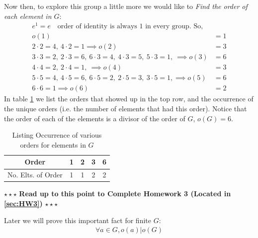\begin{example}
\noindent Now then, to explore this group a little more we would like to \textit{Find the order of
each element in $G$}:
\begin{align}
    e^1=e \ \ \ \text{ order of identity is always 1 in every group. So,}  \nonumber \\
    o(1)&=1  \nonumber \\
    2\cdot 2= 4, \ 4\cdot 2= 1 \implies o(2)&=3 \nonumber \\
    3\cdot 3= 2, \ 2\cdot 3= 6, \ 6\cdot 3=4,\ 4\cdot 3= 5,\ 5\cdot 3= 1,\ \implies  o(3)&=6 \nonumber \\
    4\cdot 4= 2,\ 2\cdot 4= 1, \ \implies o(4)&=3 \nonumber \\
    5\cdot 5= 4, \ 4\cdot 5= 6, \ 6\cdot 5=2,\ 2\cdot 5= 3,\ 3\cdot 5= 1, \implies o(5)&=6 \nonumber \\
    6\cdot 6 = 1 \implies o(6)&=2  \nonumber
\end{align}
In table \ref{tab:order_occur} we list the orders that showed up in the top row, and the occurrence
of the unique orders (i.e. the number of elements that had this order). Notice that the order of
each of the elements is a divisor of the order of $G$, $o(G)=6$.
\begin{table}[h!]
    \centering
    \begin{tabular}{|c|c|c|c|c|}\hline
         Order&1&2&3&6   \\ \hline
         No. Elts. of Order& 1&1&2&2 \\ \hline
    \end{tabular}
    \caption{Listing Occurrence of various orders for elements in $G$}
    \label{tab:order_occur}
\end{table}
\end{example}
\steezybreak
\begin{tcolorbox}
\begin{center}
    $\star\star\star$ \textbf{Read up to this point to Complete Homework 3 (Located in
    \ref{sec:HW3})} $\star\star\star$
\end{center}
\end{tcolorbox}
\steezybreak
\newpage
\noindent Later we will prove this important fact for finite $G$:
\begin{align}
    \forall a \in G, o(a)|o(G) \nonumber
\end{align}
